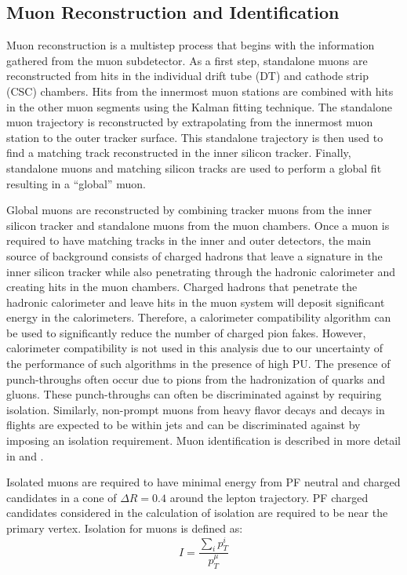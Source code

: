 \subsection{Muon Reconstruction and Identification}\label{ss:muonreco}

Muon reconstruction is a multistep process that begins with the information gathered from the muon subdetector. As a
first step, standalone muons are reconstructed from hits in the individual drift tube (DT) and
cathode strip (CSC) chambers. Hits from the innermost muon stations are combined with hits in the other muon segments
using the Kalman fitting technique\cite{Kalman}. The standalone muon trajectory is reconstructed by extrapolating from the
innermost muon station to the outer tracker surface. This standalone trajectory is then used to find a matching track
reconstructed in the inner silicon tracker. Finally, standalone muons and matching silicon tracks are used to perform a
global fit resulting in a ``global'' muon. 

Global muons are reconstructed by combining tracker muons from the inner silicon tracker and standalone muons from the
muon chambers. Once a muon is required to have matching tracks in the inner and outer detectors,
the main source of background consists of charged hadrons that leave a
signature in the inner silicon tracker while also penetrating through the hadronic calorimeter and creating hits in the
muon chambers. Charged hadrons that penetrate the hadronic calorimeter and leave hits in the muon system will deposit 
significant energy in the calorimeters. Therefore, a calorimeter compatibility algorithm can be used to significantly 
reduce the number of charged pion fakes. However, calorimeter compatibility is not used in this analysis due to our 
uncertainty of the performance of such algorithms in the presence of high PU. 
The presence of punch-throughs often occur due to pions from the hadronization of quarks and gluons. These punch-throughs 
can often be discriminated against by requiring isolation. Similarly, non-prompt muons from heavy flavor decays and 
decays in flights are expected to be within jets and can be discriminated against by imposing an isolation requirement. 
Muon identification is described in more detail in \cite{CMS_MUO_10-004} and \cite{CMS_MUO_11-001}.

Isolated muons are required to have minimal energy from PF neutral and charged candidates in a cone of $\Delta R =
0.4$ around the lepton trajectory. PF charged candidates considered in the calculation of isolation are required to be near the 
primary vertex. Isolation for muons is defined as:
\begin{equation}
   I = \frac{\sum_{i} p_{T}^{i}}{p_{T}^{\mu}}
\label{eq:muIso}
\end{equation}

